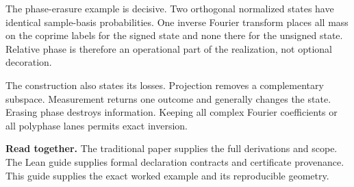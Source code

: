 The phase-erasure example is decisive. Two orthogonal normalized states have identical sample-basis probabilities. One inverse Fourier transform places all mass on the coprime labels for the signed state and none there for the unsigned state. Relative phase is therefore an operational part of the realization, not optional decoration.

The construction also states its losses. Projection removes a complementary subspace. Measurement returns one outcome and generally changes the state. Erasing phase destroys information. Keeping all complex Fourier coefficients or all polyphase lanes permits exact inversion.

\textbf{Read together.} The traditional paper supplies the full derivations and scope. The Lean guide supplies formal declaration contracts and certificate provenance. This guide supplies the exact worked example and its reproducible geometry.
